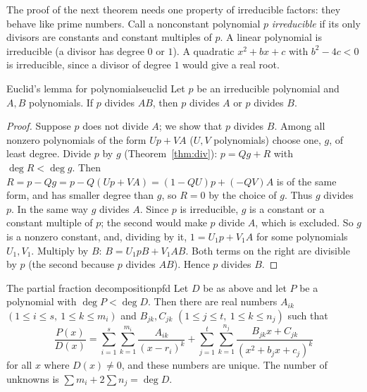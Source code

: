 \documentclass[11pt]{article}
\begin{document}
The proof of the next theorem needs one property of irreducible factors: they behave like prime numbers. Call a nonconstant polynomial $p$ \emph{irreducible} if its only divisors are constants and constant multiples of $p$. A linear polynomial is irreducible (a divisor has degree $0$ or $1$). A quadratic $x^2+bx+c$ with $b^2-4c<0$ is irreducible, since a divisor of degree $1$ would give a real root.

\begin{thm}{Euclid's lemma for polynomials}{euclid}
Let $p$ be an irreducible polynomial and $A,B$ polynomials. If $p$ divides $AB$, then $p$ divides $A$ or $p$ divides $B$.
\end{thm}
\begin{proof}
Suppose $p$ does not divide $A$; we show that $p$ divides $B$. Among all nonzero polynomials of the form $Up+VA$ ($U,V$ polynomials) choose one, $g$, of least degree. Divide $p$ by $g$ (Theorem~\ref{thm:div}): $p=Qg+R$ with $\deg R<\deg g$. Then $R=p-Qg=p-Q(Up+VA)=(1-QU)p+(-QV)A$ is of the same form, and has smaller degree than $g$, so $R=0$ by the choice of $g$. Thus $g$ divides $p$. In the same way $g$ divides $A$. Since $p$ is irreducible, $g$ is a constant or a constant multiple of $p$; the second would make $p$ divide $A$, which is excluded. So $g$ is a nonzero constant, and, dividing by it, $1=U_1p+V_1A$ for some polynomials $U_1,V_1$. Multiply by $B$: $B=U_1pB+V_1AB$. Both terms on the right are divisible by $p$ (the second because $p$ divides $AB$). Hence $p$ divides $B$.
\end{proof}

\begin{thm}{The partial fraction decomposition}{pfd}
Let $D$ be as above and let $P$ be a polynomial with $\deg P<\deg D$. Then there are real numbers $A_{ik}$ $(1\le i\le s,\ 1\le k\le m_i)$ and $B_{jk},C_{jk}$ $(1\le j\le t,\ 1\le k\le n_j)$ such that
\[\frac{P(x)}{D(x)}=\sum_{i=1}^s\sum_{k=1}^{m_i}\frac{A_{ik}}{(x-r_i)^k}+\sum_{j=1}^t\sum_{k=1}^{n_j}\frac{B_{jk}x+C_{jk}}{\left(x^2+b_jx+c_j\right)^k}\]
for all $x$ where $D(x)\ne0$, and these numbers are unique. The number of unknowns is $\sum m_i+2\sum n_j=\deg D$.
\end{thm}
\end{document}
